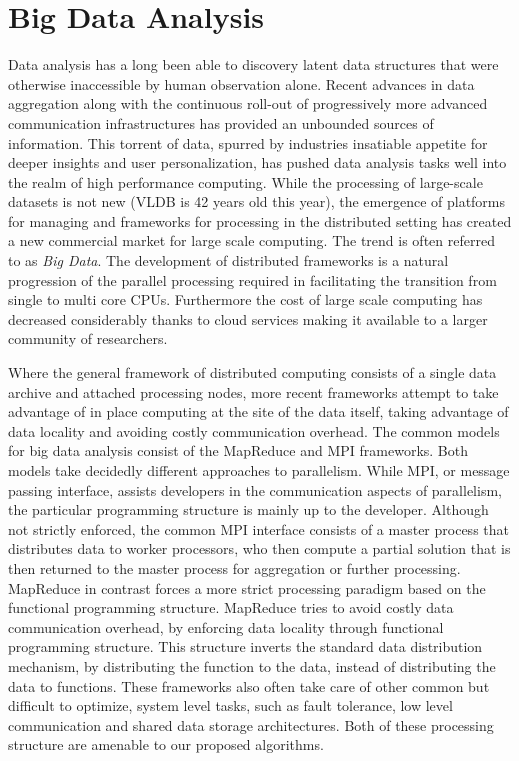 \section{Big Data Analysis}
Data analysis has a long been able to discovery latent data structures that were otherwise inaccessible by human
observation alone\cite{calderbank}.  
Recent advances in data aggregation along with the continuous roll-out of progressively more
advanced communication infrastructures has provided an unbounded sources of information.  This torrent of data, spurred
by industries insatiable appetite for deeper insights and user personalization, has pushed data analysis tasks well into
the realm of high performance computing.  While the processing of large-scale datasets is not new (VLDB is 42 years old this
year), the emergence of platforms for managing and frameworks for processing in the distributed setting has created a
new commercial market for large scale computing.  The trend is often referred to as \emph{Big Data}.  The development of
distributed frameworks is a natural progression of the parallel processing required in facilitating the transition from
single to multi core CPUs.  Furthermore the cost of large scale computing has decreased considerably thanks to cloud
services making it available to a larger community of researchers.

Where the general framework of distributed computing consists of a single data archive and attached processing nodes,
more recent frameworks attempt to take advantage of in place computing at the site of the data itself, taking advantage
of data locality and avoiding costly communication overhead. The common models for big data analysis consist of the 
MapReduce \cite{dean-08} and MPI \cite{mpi-spec-93} frameworks.  Both models take decidedly different approaches to parallelism.  
While MPI, or message passing interface, assists developers in the communication aspects of parallelism, the particular 
programming structure is mainly up to the developer.  Although not strictly enforced, the common MPI interface consists of
a master process that distributes data to worker processors, who then compute a partial solution that is then returned to the
master process for aggregation or further processing. MapReduce in contrast forces a more strict processing paradigm based on 
the functional programming structure.  MapReduce tries to avoid costly data communication overhead, by enforcing data locality
through functional programming structure.  This structure inverts the standard data distribution mechanism, by distributing 
the function to the data, instead of distributing the data to functions. These frameworks also often take care of other common 
but difficult to optimize, system level tasks, such as fault tolerance, low level communication and shared data storage 
architectures.  Both of these processing structure are amenable to our proposed algorithms.
 
